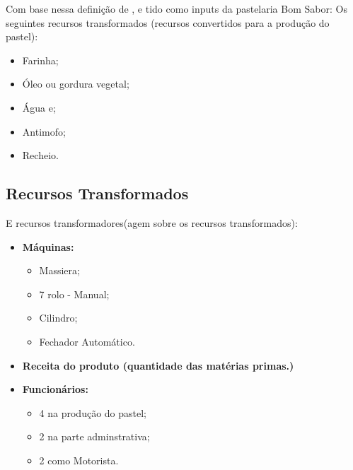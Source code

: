 Com base nessa definição de \cite{slack}, e tido como inputs da pastelaria Bom Sabor:
Os seguintes recursos transformados (recursos convertidos para a produção do pastel):

\begin{itemize}
\item Farinha;
\item Óleo ou gordura vegetal;
\item Água e;
\item Antimofo;
\item Recheio.
\end{itemize}

\subsection{Recursos Transformados}

E recursos transformadores(agem sobre os recursos transformados):

\begin{itemize}
\item \textbf{Máquinas:}
	\begin{itemize}
	\item Massiera;
	\item 7 rolo - Manual;
	\item Cilindro;
	\item Fechador Automático.
	\end{itemize}
\item \textbf{Receita do produto (quantidade das matérias primas.)}
\item \textbf{Funcionários:} 
	\begin{itemize}
	\item 4 na produção do pastel;
	\item 2 na parte adminstrativa;
	\item 2 como Motorista.
	\end{itemize}
\end{itemize}